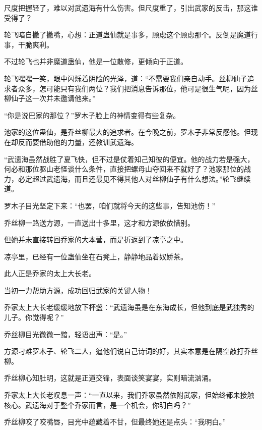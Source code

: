 \begin{this_body}
尺度把握轻了，难以对武遗海有什么伤害。但尺度重了，引出武家的反击，那这谁受得了？

轮飞暗自撇了撇嘴，心想：正道蛊仙就是事多，顾虑这个顾虑那个。反倒是魔道行事，干脆爽利。

不过轮飞也并非魔道蛊仙，他是一位散修，更倾向于正道。

轮飞嘿嘿一笑，眼中闪烁着阴险的光泽，道：“不需要我们亲自动手。丝柳仙子追求者众多，怎可能只有我们两位？我们把消息告诉那位，他可是很生气呢，因为丝柳仙子这一次并未邀请他来。”

“你是说巴家的那位？”罗木子脸上的神情变得有些复杂。

池家的这位蛊仙，是乔丝柳最大的追求者。在今晚之前，罗木子非常反感他。但现在却反而要借助他的力量，还教训武遗海。

“武遗海虽然战胜了夏飞快，但不过是仗着知己知彼的便宜。他的战力若是强大，何必和那位驱山老怪谈什么条件，直接把螺母山夺回来不就好了？池家那位的战力，必定超过武遗海，而且还最见不得其他人对丝柳仙子有什么想法。”轮飞继续道。

罗木子目光坚定下来：“也罢，咱们就将今天的这些事，告知池伤！”

乔丝柳一路送方源，一直送出十多里，这才和方源依依惜别。

但她并未直接转回乔家的大本营，而是折返到了凉亭之中。

凉亭里，已经有一位蛊仙坐在石凳上，静静地品着奴娇茶。

此人正是乔家的太上大长老。

当初一力帮助方源，成功回归武家的关键人物！

乔家太上大长老缓缓地放下杯盏：“武遗海虽是在东海成长，但他到底是武独秀的儿子。你觉得呢？”

乔丝柳目光微微一黯，轻语出声：“是。”

方源刁难罗木子、轮飞二人，逼他们说自己诗词的好，其实本意是在隔空敲打乔丝柳。

乔丝柳心知肚明，这就是正道交锋，表面谈笑宴宴，实则暗流汹涌。

乔家太上大长老叹息一声：“一直以来，我们乔家虽然依附武家，但始终都未接触核心。武遗海对于整个乔家而言，是一个机会，你明白吗？”

乔丝柳咬了咬嘴唇，目光中蕴藏着不甘，但最终她还是点头：“我明白。”

\end{this_body}

